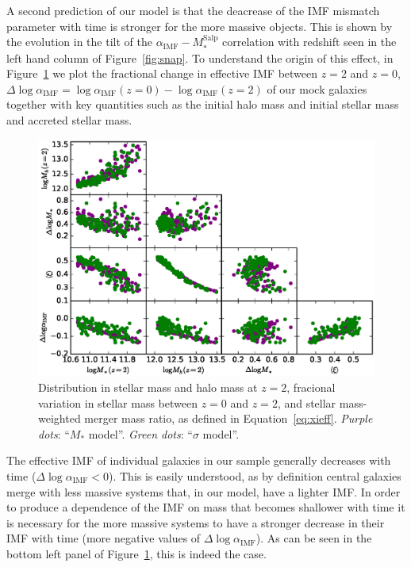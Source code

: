 \documentclass[usenatbib, letters]{mnras}
\def\msalp{M_*^{\mathrm{Salp}}}
\def\aimf{\alpha_{\mathrm{IMF}}}
\def\Fref#1{Figure~\ref{#1}\xspace}
\def\Eref#1{Equation~\ref{#1}\xspace}
\begin{document}
A second prediction of our model is that the deacrease of the IMF mismatch parameter with time is stronger for the more massive objects. This is shown by the evolution in the tilt of the $\aimf-\msalp$ correlation with redshift seen in the left hand column of \Fref{fig:snap}.
To understand the origin of this effect, in \Fref{fig:cornerplot} we plot the fractional change in effective IMF between $z=2$ and $z=0$, $\Delta\log{\aimf}=\log{\aimf}(z=0)-\log{\aimf}(z=2)$ of our mock galaxies together with key quantities such as the initial halo mass and initial stellar mass and accreted stellar mass. 
%
\begin{figure}
 \includegraphics[width=\textwidth]{cornerplot.eps}
 \caption{
Distribution in stellar mass and halo mass at $z=2$, fracional variation in stellar mass between $z=0$ and $z=2$, and stellar mass-weighted merger mass ratio, as defined in \Eref{eq:xieff}.
{\em Purple dots}: ``$M_*$ model''. {\em Green dots}: ``$\sigma$ model''.
}
 \label{fig:cornerplot}
\end{figure}
%
The effective IMF of individual galaxies in our sample generally decreases with time ($\Delta\log{\aimf}<0$). This is easily understood, as by definition central galaxies merge with less massive systems that, in our model, have a lighter IMF. 
In order to produce a dependence of the IMF on mass that becomes shallower with time it is necessary for the more massive systems to have a stronger decrease in their IMF with time (more negative values of $\Delta\log{\aimf}$).
As can be seen in the bottom left panel of \Fref{fig:cornerplot}, this is indeed the case.
\end{document}
